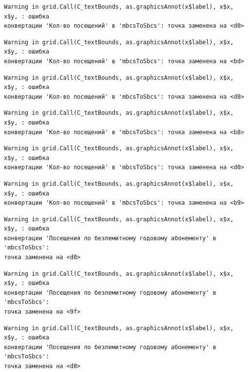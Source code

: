 \documentclass[
  letterpaper,
  DIV=11,
  numbers=noendperiod]{scrreprt}
\begin{document}
\begin{verbatim}
Warning in grid.Call(C_textBounds, as.graphicsAnnot(x$label), x$x, x$y, : ошибка
конвертации 'Кол-во посещений' в 'mbcsToSbcs': точка заменена на <d0>
\end{verbatim}

\begin{verbatim}
Warning in grid.Call(C_textBounds, as.graphicsAnnot(x$label), x$x, x$y, : ошибка
конвертации 'Кол-во посещений' в 'mbcsToSbcs': точка заменена на <bd>
\end{verbatim}

\begin{verbatim}
Warning in grid.Call(C_textBounds, as.graphicsAnnot(x$label), x$x, x$y, : ошибка
конвертации 'Кол-во посещений' в 'mbcsToSbcs': точка заменена на <d0>
\end{verbatim}

\begin{verbatim}
Warning in grid.Call(C_textBounds, as.graphicsAnnot(x$label), x$x, x$y, : ошибка
конвертации 'Кол-во посещений' в 'mbcsToSbcs': точка заменена на <b8>
\end{verbatim}

\begin{verbatim}
Warning in grid.Call(C_textBounds, as.graphicsAnnot(x$label), x$x, x$y, : ошибка
конвертации 'Кол-во посещений' в 'mbcsToSbcs': точка заменена на <d0>
\end{verbatim}

\begin{verbatim}
Warning in grid.Call(C_textBounds, as.graphicsAnnot(x$label), x$x, x$y, : ошибка
конвертации 'Кол-во посещений' в 'mbcsToSbcs': точка заменена на <b9>
\end{verbatim}

\begin{verbatim}
Warning in grid.Call(C_textBounds, as.graphicsAnnot(x$label), x$x, x$y, : ошибка
конвертации 'Посещения по безлемитному годовому абонементу' в 'mbcsToSbcs':
точка заменена на <d0>
\end{verbatim}

\begin{verbatim}
Warning in grid.Call(C_textBounds, as.graphicsAnnot(x$label), x$x, x$y, : ошибка
конвертации 'Посещения по безлемитному годовому абонементу' в 'mbcsToSbcs':
точка заменена на <9f>
\end{verbatim}

\begin{verbatim}
Warning in grid.Call(C_textBounds, as.graphicsAnnot(x$label), x$x, x$y, : ошибка
конвертации 'Посещения по безлемитному годовому абонементу' в 'mbcsToSbcs':
точка заменена на <d0>
\end{verbatim}
\end{document}
